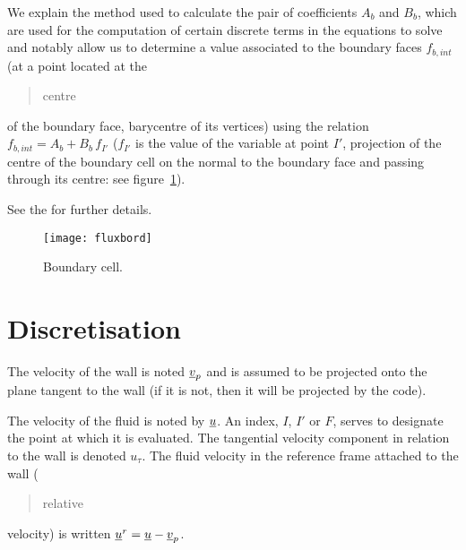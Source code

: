 We explain the method used to calculate the pair of coefficients $A_b$ and $B_b$, which are
used for the computation of certain discrete terms in the equations to solve and notably allow
us to determine a value associated to the boundary faces $f_{b,int}$ (at a point located
at the \begin{quotation}
centre
\end{quotation}of the boundary face, barycentre of its vertices) using the relation
$f_{b,int} = A_b+B_b\,f_{I'}$ ($f_{I'}$ is the value of the variable at point
$I'$, projection of the centre of the boundary cell on the normal to the boundary face
and passing through its centre: see figure~\ref{fig_flux_clptur}).

See the  for further details.

\begin{figure}[h]
\centerline{\texttt{[image: fluxbord]}}
\caption{\label{fig_flux_clptur}Boundary cell.}
\end{figure}

\section*{Discretisation}

The velocity of the wall is noted $\underline{v}_p$ and is assumed to be projected onto
the plane tangent to the wall (if it is not, then it will be projected by the code).

The velocity of the fluid is noted by $\underline{u}$. An index, $I$, $I'$ or $F$, serves
to designate the point at which it is evaluated. The tangential velocity component in
relation to the wall is denoted $u_\tau$. The fluid velocity in the reference frame
attached to the wall (\begin{quotation}
relative
\end{quotation} velocity) is written $\underline{u}^r=\underline{u} - \underline{v}_p$.

